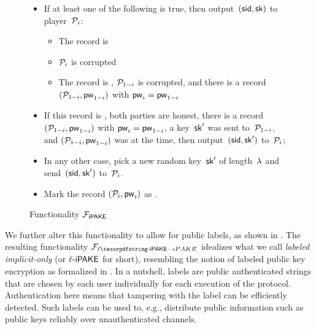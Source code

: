 \begin{figure}[tb]
\begin{fboxenv}
\begin{minipage}{0.95\textwidth}
\begin{itemize}
\begin{itemize}
          \item If at least one of the following is true, then output~$(\mathsf{sid},\mathsf{sk})$ to player~$\mathcal{P}_{i}$:
          \begin{itemize}
           \item The record is 
           \item $\mathcal{P}_{i}$ is corrupted
           \item The record is , $\mathcal{P}_{1-i}$ is corrupted, and there is a record~$(\mathcal{P}_{1-i},\mathsf{pw}_{1-i})$ with $\mathsf{pw}_{i}=\mathsf{pw}_{1-i}$
          \end{itemize}
          \item If this record is , both parties are honest, there is a record~$(\mathcal{P}_{1-i},\mathsf{pw}_{1-i})$ with $\mathsf{pw}_{i}=\mathsf{pw}_{1-i}$, a key~$\mathsf{sk}'$ was sent to~$\mathcal{P}_{1-i}$,
          and $(\mathcal{P}_{1-i},\mathsf{pw}_{1-i})$ was  at the time, then output~$(\mathsf{sid},\mathsf{sk}')$ to~$\mathcal{P}_{i}$;
          \item In any other case, pick a new random key~$\mathsf{sk}'$ of length~$\lambda$ and send~$(\mathsf{sid},\mathsf{sk}')$ to~$\mathcal{P}_{i}$.
          \item Mark the record $(\mathcal{P}_{i},\mathsf{pw}_{i})$ as .
        \end{itemize}
      \end{itemize}
    \end{minipage}
  \end{fboxenv}
  \caption{Functionality $\mathcal{F}_\textsf{iPAKE}$}\label{fig:func-iPAKE}
\end{figure}
We further alter this functionality to allow for public labels, as shown in \iftoggle{full}{, Figure~\ref{fig:func-liPAKE}}{}. 
The resulting functionality $\FliPAKE$ idealizes what we call \emph{labeled implicit-only \PAKE} (or $\ell\textsf{-iPAKE}$ for short), resembling the notion of labeled public key encryption as formalized in \cite{EPRINT:Shoup01}. In a nutshell, labels are public authenticated strings that are chosen by each user individually for each execution of the protocol. 
Authentication here means that tampering with the label can be efficiently detected. Such labels can be used to, e.g., distribute public information such as public keys reliably over unauthenticated channels. 

